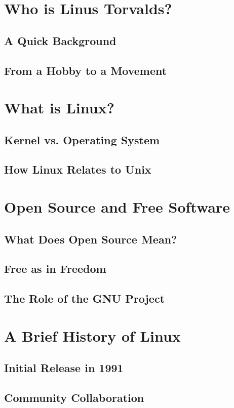 	\section{Who is Linus Torvalds?}
	\subsection{A Quick Background}
	\subsection{From a Hobby to a Movement}
	
	\section{What is Linux?}
	\subsection{Kernel vs. Operating System}
	\subsection{How Linux Relates to Unix}
	
	\section{Open Source and Free Software}
	\subsection{What Does Open Source Mean?}
	\subsection{Free as in Freedom}
	\subsection{The Role of the GNU Project}
	
	\section{A Brief History of Linux}
	\subsection{Initial Release in 1991}
	\subsection{Community Collaboration}
